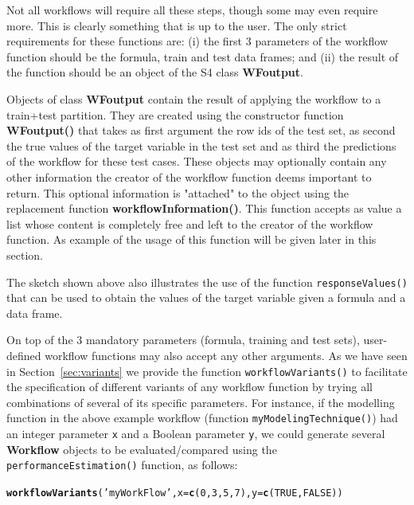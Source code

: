 \documentclass[10pt,a4paper]{article}\usepackage[]{graphicx}\usepackage[]{color}
\makeatletter
\newcommand{\hlnum}[1]{\textcolor[rgb]{0.686,0.059,0.569}{#1}}%
\newcommand{\hlstr}[1]{\textcolor[rgb]{0.192,0.494,0.8}{#1}}%
\newcommand{\hlstd}[1]{\textcolor[rgb]{0.345,0.345,0.345}{#1}}%
\newcommand{\hlkwc}[1]{\textcolor[rgb]{0.333,0.667,0.333}{#1}}%
\newcommand{\hlkwd}[1]{\textcolor[rgb]{0.737,0.353,0.396}{\textbf{#1}}}%
\newenvironment{kframe}{%
 \def\at@end@of@kframe{}%
 \ifinner\ifhmode%
  \def\at@end@of@kframe{\end{minipage}}%
  \begin{minipage}{\columnwidth}%
 \fi\fi%
 \def\FrameCommand##1{\hskip\@totalleftmargin \hskip-\fboxsep
 \colorbox{shadecolor}{##1}\hskip-\fboxsep
     \hskip-\linewidth \hskip-\@totalleftmargin \hskip\columnwidth}%
 \MakeFramed {\advance\hsize-\width
   \@totalleftmargin\z@ \linewidth\hsize
   \@setminipage}}%
 {\par\unskip\endMakeFramed%
 \at@end@of@kframe}
\newenvironment{knitrout}{}{} %
\makeatother
\begin{document}
Not all workflows will require all these steps, though some may even
require more. This is clearly something that is up to the user. The
only strict requirements for these functions are: (i) the first 3
parameters of the workflow function should be the formula, train and
test data frames; and (ii) the result of the function should be an
object of the S4 class \textbf{WFoutput}.

Objects of class \textbf{WFoutput} contain the result of applying the
workflow to a train+test partition. They are created using the
constructor function \textbf{WFoutput()} that takes as first argument the row ids of the test set, as second the true values of the target variable in the test set and as third the predictions of the workflow for these test cases. These
objects may optionally contain any other information the creator of the workflow function deems
important to return. This optional information is "attached" to the object using the replacement function \textbf{workflowInformation()}. This function accepts as value  a
list  whose content is completely free and left to the creator of
the workflow function. As example of the usage of this function will be given later in this section. 

The sketch shown above also illustrates the use of the function
\texttt{responseValues()} that can be used to obtain the values of the target
variable given a formula and a data frame.

On top of the 3 mandatory parameters (formula, training and test sets), user-defined workflow functions may also accept any other arguments. As we have seen in Section~\ref{sec:variants} we provide
the function \texttt{workflowVariants()} to facilitate the specification of
different variants of any workflow function by trying all combinations
of several of its specific parameters. For instance, if the modelling
function in the above example workflow (function
\texttt{myModelingTechnique()}) had an integer parameter \texttt{x}
and a Boolean parameter \texttt{y}, we could generate several
\textbf{Workflow} objects to be evaluated/compared using the
\texttt{performanceEstimation()} function, as follows:

\begin{knitrout}\footnotesize
{}\color{fgcolor}\begin{kframe}
\begin{alltt}
\hlkwd{workflowVariants}\hlstd{(}\hlstr{'myWorkFlow'}\hlstd{,}\hlkwc{x}\hlstd{=}\hlkwd{c}\hlstd{(}\hlnum{0}\hlstd{,}\hlnum{3}\hlstd{,}\hlnum{5}\hlstd{,}\hlnum{7}\hlstd{),}\hlkwc{y}\hlstd{=}\hlkwd{c}\hlstd{(}\hlnum{TRUE}\hlstd{,}\hlnum{FALSE}\hlstd{))}
\end{alltt}
\end{kframe}
\end{knitrout}
\end{document}
